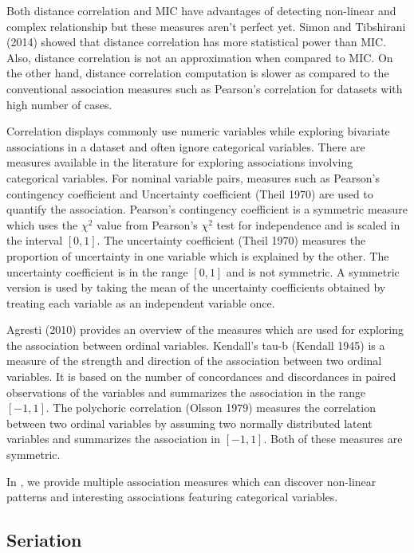 Both distance correlation and MIC have advantages of detecting non-linear and complex relationship but these measures aren't perfect yet. Simon and Tibshirani (2014) showed that distance correlation has more statistical power than MIC. Also, distance correlation is not an approximation when compared to MIC. On the other hand, distance correlation computation is slower as compared to the conventional association measures such as Pearson's correlation for datasets with high number of cases.

Correlation displays commonly use numeric variables while exploring bivariate associations in a dataset and often ignore categorical variables. There are measures available in the literature for exploring associations involving categorical variables. For nominal variable pairs, measures such as Pearson's contingency coefficient and Uncertainty coefficient (Theil 1970) are used to quantify the association. Pearson's contingency coefficient is a symmetric measure which uses the \({\chi}^2\) value from Pearson's \({\chi}^2\) test for independence and is scaled in the interval \([0,1]\). The uncertainty coefficient (Theil 1970) measures the proportion of uncertainty in one variable which is explained by the other. The uncertainty coefficient is in the range \([0,1]\) and is not symmetric. A symmetric version is used by taking the mean of the uncertainty coefficients obtained by treating each variable as an independent variable once.

Agresti (2010) provides an overview of the measures which are used for exploring the association between ordinal variables. Kendall's tau-b (Kendall 1945) is a measure of the strength and direction of the association between two ordinal variables. It is based on the number of concordances and discordances in paired observations of the variables and summarizes the association in the range \([-1,1]\). The polychoric correlation (Olsson 1979) measures the correlation between two ordinal variables by assuming two normally distributed latent variables and summarizes the association in \([-1,1]\). Both of these measures are symmetric.

In , we provide multiple association measures which can discover non-linear patterns and interesting associations featuring categorical variables.

\hypertarget{seriation}{%
\subsection{Seriation}\label{seriation}}

